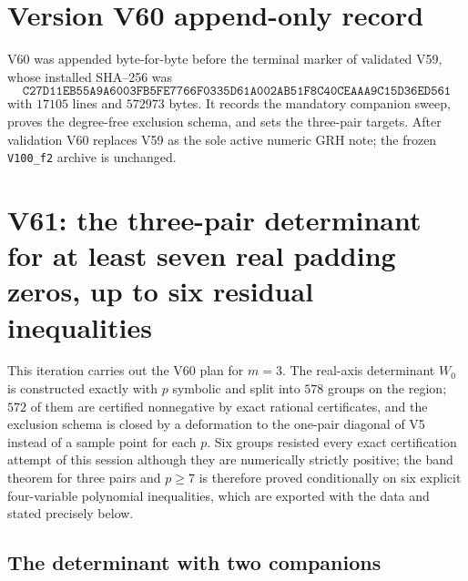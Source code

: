 \documentclass[11pt]{article}
\theoremstyle{definition}
\theoremstyle{remark}
\begin{document}
\section*{Version V60 append-only record}

V60 was appended byte-for-byte before the terminal marker of validated
V59, whose installed SHA--256 was
\[
 \texttt{C27D11EB55A9A6003FB5FE7766F0335D}
 \allowbreak\texttt{61A002AB51F8C40CEAAA9C15D36ED561}
\]
with \(17105\) lines and \(572973\) bytes.  It records the mandatory
companion sweep, proves the degree-free exclusion schema, and sets the
three-pair targets.  After validation V60 replaces V59 as the sole
active numeric GRH note; the frozen \texttt{V100\_f2} archive is
unchanged.





\clearpage
\section{V61: the three-pair determinant for at least seven real padding zeros, up to six residual inequalities}
\label{sec:f2v61-three-pair}
\begingroup
\setcounter{equation}{0}
\renewcommand{\theequation}{N61.\arabic{equation}}
\renewcommand{\theHequation}{f2v61.\arabic{equation}}

This iteration carries out the V60 plan for \(m=3\).  The real-axis
determinant \(W_0\) is constructed exactly with \(p\) symbolic and split
into \(578\) groups on the region; \(572\) of them are certified
nonnegative by exact rational certificates, and the exclusion schema is
closed by a deformation to the one-pair diagonal of V5 instead of a
sample point for each \(p\).  Six groups resisted every exact
certification attempt of this session although they are numerically
strictly positive; the band theorem for three pairs and \(p\ge7\) is
therefore proved conditionally on six explicit four-variable polynomial
inequalities, which are exported with the data and stated precisely
below.

\subsection{The determinant with two companions}
\end{document}
